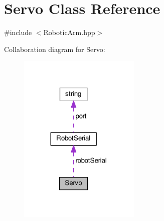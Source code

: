\hypertarget{struct_servo}{}\section{Servo Class Reference}
\label{struct_servo}


{\ttfamily \#include $<$Robotic\+Arm.\+hpp$>$}



Collaboration diagram for Servo\+:\nopagebreak
\begin{figure}[H]
\begin{center}
\leavevmode
\includegraphics[width=164pt]{struct_servo__coll__graph}
\end{center}
\end{figure}
